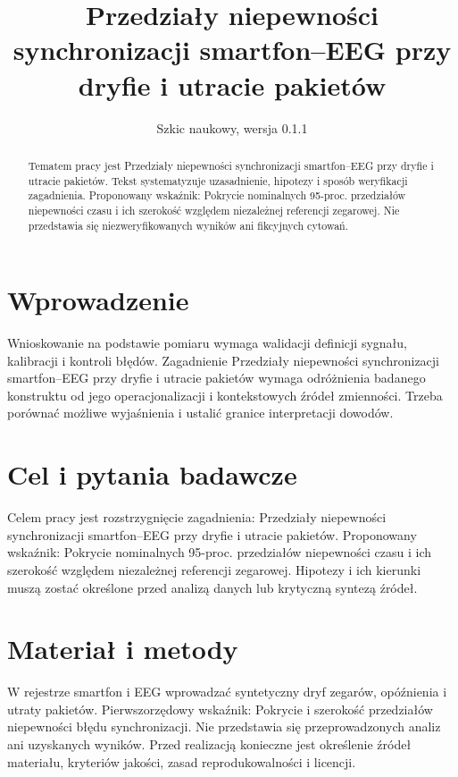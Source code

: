 \documentclass[11pt,a4paper]{article}
\title{Przedziały niepewności synchronizacji smartfon--EEG przy dryfie i utracie pakietów}
\author{}
\date{Szkic naukowy, wersja 0.1.1}
\begin{document}
\maketitle

\begin{abstract}

Tematem pracy jest Przedziały niepewności synchronizacji smartfon--EEG przy dryfie i utracie pakietów. Tekst systematyzuje uzasadnienie, hipotezy i sposób weryfikacji zagadnienia. Proponowany wskaźnik: Pokrycie nominalnych 95-proc. przedziałów niepewności czasu i ich szerokość względem niezależnej referencji zegarowej. Nie przedstawia się niezweryfikowanych wyników ani fikcyjnych cytowań.

\end{abstract}

\section{Wprowadzenie}

Wnioskowanie na podstawie pomiaru wymaga walidacji definicji sygnału, kalibracji i kontroli błędów. Zagadnienie Przedziały niepewności synchronizacji smartfon--EEG przy dryfie i utracie pakietów wymaga odróżnienia badanego konstruktu od jego operacjonalizacji i kontekstowych źródeł zmienności. Trzeba porównać możliwe wyjaśnienia i ustalić granice interpretacji dowodów.

\section{Cel i pytania badawcze}

Celem pracy jest rozstrzygnięcie zagadnienia: Przedziały niepewności synchronizacji smartfon--EEG przy dryfie i utracie pakietów. Proponowany wskaźnik: Pokrycie nominalnych 95-proc. przedziałów niepewności czasu i ich szerokość względem niezależnej referencji zegarowej. Hipotezy i ich kierunki muszą zostać określone przed analizą danych lub krytyczną syntezą źródeł.

\section{Materiał i metody}

W rejestrze smartfon i EEG wprowadzać syntetyczny dryf zegarów, opóźnienia i utraty pakietów. Pierwszorzędowy wskaźnik: Pokrycie i szerokość przedziałów niepewności błędu synchronizacji. Nie przedstawia się przeprowadzonych analiz ani uzyskanych wyników. Przed realizacją konieczne jest określenie źródeł materiału, kryteriów jakości, zasad reprodukowalności i licencji.
\end{document}
